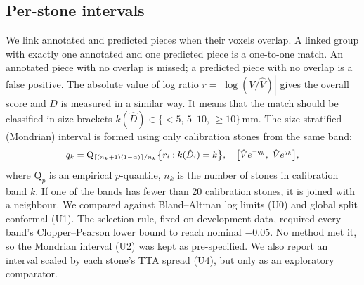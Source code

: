 \documentclass[conference]{IEEEtran}
\begin{document}
\subsection{Per-stone intervals}
We link annotated and predicted pieces when their voxels overlap. A linked group with exactly one annotated and one predicted piece is a one-to-one match. An annotated piece with no overlap is missed; a predicted piece with no overlap is a false positive. The absolute value of log ratio $r=|\log(V/\hat V)|$ gives the overall score and $D$ is measured in a similar way. It means that the match should be classified in size brackets $k(\hat D)\in\{{<}5,\,5\text{--}10,\,{\ge}10\}$\,mm. The size-stratified (Mondrian) interval is formed using only calibration stones from the same band:
\begin{equation}
\hbox{\small$\displaystyle q_k=\mathrm{Q}_{\lceil (n_k+1)(1-\alpha)\rceil/n_k}\bigl\{r_i : k(\hat D_i)=k\bigr\},\quad
\bigl[\hat V e^{-q_k},\ \hat V e^{q_k}\bigr],$}
\end{equation}
where $\mathrm{Q}_p$ is an empirical $p$-quantile, $n_k$ is the number of stones in calibration band $k$. If one of the bands has fewer than 20 calibration stones, it is joined with a neighbour. We compared against Bland--Altman log limits (U0) and global split conformal (U1). The selection rule, fixed on development data, required every band's Clopper--Pearson lower bound to reach nominal $-0.05$. No method met it, so the Mondrian interval (U2) was kept as pre-specified. We also report an interval scaled by each stone's TTA spread (U4), but only as an exploratory comparator.
\end{document}
